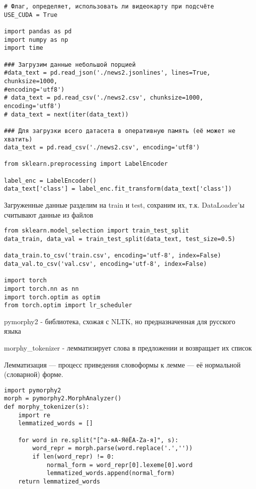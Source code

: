 \solutionSection

\begin{verbatim}
# Флаг, определяет, использовать ли видеокарту при подсчёте
USE_CUDA = True

import pandas as pd
import numpy as np
import time

### Загрузим данные небольшой порцией
#data_text = pd.read_json('./news2.jsonlines', lines=True, chunksize=1000, 
#encoding='utf8')
# data_text = pd.read_csv('./news2.csv', chunksize=1000, encoding='utf8')
# data_text = next(iter(data_text))

### Для загрузки всего датасета в оперативную память (её может не хватить)
data_text = pd.read_csv('./news2.csv', encoding='utf8')

from sklearn.preprocessing import LabelEncoder

label_enc = LabelEncoder()
data_text['class'] = label_enc.fit_transform(data_text['class'])
\end{verbatim}

Загруженные данные разделим на train и test, сохраним их, т.к. DataLoader'ы считывают данные из файлов

\begin{verbatim}
from sklearn.model_selection import train_test_split
data_train, data_val = train_test_split(data_text, test_size=0.5)

data_train.to_csv('train.csv', encoding='utf-8', index=False)
data_val.to_csv('val.csv', encoding='utf-8', index=False)

import torch
import torch.nn as nn
import torch.optim as optim
from torch.optim import lr_scheduler
\end{verbatim}

pymorphy2 - библиотека, схожая с NLTK, но предназначенная для русского языка

morphy\_tokenizer - лемматизирует слова в предложении и возвращает их список

Лемматизация — процесс приведения словоформы к лемме — её нормальной (словарной) форме.

\begin{verbatim}
import pymorphy2
morph = pymorphy2.MorphAnalyzer()
def morphy_tokenizer(s):
    import re
    lemmatized_words = []
    
    for word in re.split("[^а-яА-ЯёЁA-Zа-я]", s):
        word_repr = morph.parse(word.replace('.',''))
        if len(word_repr) != 0:
            normal_form = word_repr[0].lexeme[0].word
            lemmatized_words.append(normal_form)
    return lemmatized_words
\end{verbatim}

